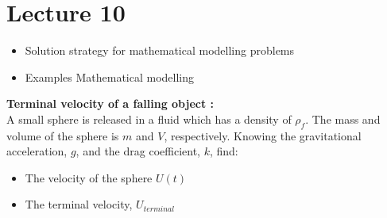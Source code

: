 \chapter*{Lecture 10}
\begin{recall}{}{}
\begin{itemize}
\item Solution strategy for mathematical modelling problems
\item Examples Mathematical modelling
\end{itemize}
\end{recall}






\textbf{Terminal velocity of a falling object :}\\
A small sphere is released in a fluid which has a density of $\rho_f$. The mass and volume of the sphere is $m$ and $V$, respectively. Knowing the gravitational acceleration, $g$, and the drag coefficient, $k$, find:
\begin{itemize}
\item The velocity of the sphere $U(t)$
\item The terminal velocity, $U_{terminal}$
\end{itemize}

